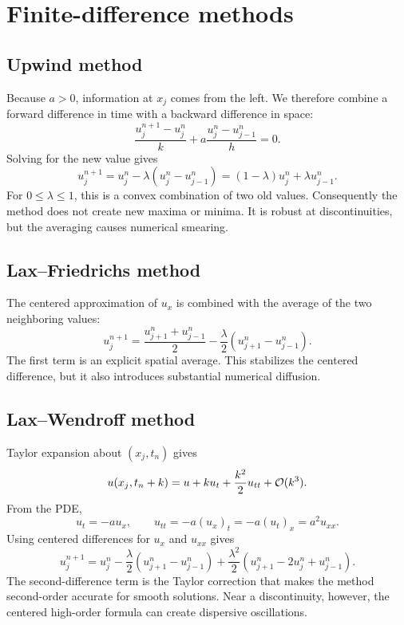 \section{Finite-difference methods}

\subsection{Upwind method}

Because $a>0$, information at $x_j$ comes from the left. We therefore combine
a forward difference in time with a backward difference in space:
\begin{equation}
 \frac{u_j^{n+1}-u_j^n}{k}
 +a\frac{u_j^n-u_{j-1}^n}{h}=0.
\end{equation}
Solving for the new value gives
\begin{equation}
 \boxed{u_j^{n+1}
 =u_j^n-\lambda(u_j^n-u_{j-1}^n)
 =(1-\lambda)u_j^n+\lambda u_{j-1}^n.}
 \label{eq:upwind}
\end{equation}
For $0\leq\lambda\leq1$, this is a convex combination of two old values.
Consequently the method does not create new maxima or minima. It is robust at
discontinuities, but the averaging causes numerical smearing.

\subsection{Lax--Friedrichs method}

The centered approximation of $u_x$ is combined with the average of the two
neighboring values:
\begin{equation}
 \boxed{u_j^{n+1}
 =\frac{u_{j+1}^n+u_{j-1}^n}{2}
 -\frac{\lambda}{2}(u_{j+1}^n-u_{j-1}^n).}
 \label{eq:lax-friedrichs}
\end{equation}
The first term is an explicit spatial average. This stabilizes the centered
difference, but it also introduces substantial numerical diffusion.

\subsection{Lax--Wendroff method}

Taylor expansion about $(x_j,t_n)$ gives
\begin{equation}
 u(x_j,t_n+k)
 =u+k u_t+\frac{k^2}{2}u_{tt}+\mathcal{O}(k^3).
\end{equation}
From the PDE,
\[
 u_t=-a u_x,
 \qquad
 u_{tt}=-a(u_x)_t=-a(u_t)_x=a^2u_{xx}.
\]
Using centered differences for $u_x$ and $u_{xx}$ gives
\begin{equation}
 \boxed{
 u_j^{n+1}=u_j^n
 -\frac{\lambda}{2}(u_{j+1}^n-u_{j-1}^n)
 +\frac{\lambda^2}{2}
 (u_{j+1}^n-2u_j^n+u_{j-1}^n).}
 \label{eq:lax-wendroff}
\end{equation}
The second-difference term is the Taylor correction that makes the method
second-order accurate for smooth solutions. Near a discontinuity, however,
the centered high-order formula can create dispersive oscillations.

